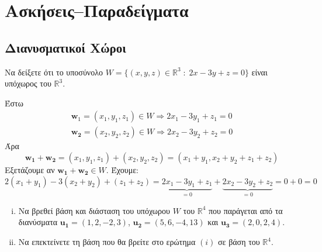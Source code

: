 





\chapter{Ασκήσεις--Παραδείγματα}

\section{Διανυσματικοί Χώροι}





\begin{exercise}
    Να δείξετε ότι το υποσύνολο $ W = \{(x,y,z)\in \mathbb{R}^{3} \; : 
    \; 2x-3y+z=0 \} $ είναι υπόχωρος του $ \mathbb{R}^{3} $.
\end{exercise}

\begin{solution}
\item {}
    Έστω 
    \begin{align*}
        \mathbf{w}_{1} = (x_{1}, y_{1}, z_{1}) \in W 
        \Rightarrow  2 x_{1} - 3 y_{1} + z_{1} = 0 \\
        \mathbf{w_{2}} = (x_{2}, y_{2}, z_{2}) \in W 
        \Rightarrow 2 x_{2} - 3 y_{2} + z_{2} = 0
    \end{align*} 
    Άρα 
    \[
        \mathbf{w_{1}}+ \mathbf{w_{2}} = (x_{1}, y_{1}, z_{1}) + 
        (x_{2}, y_{2}, z_{2}) = (x_{1}+ y_{1}, x_{2}+ y_{2}+ z_{1} + z_{2})
    \] 
    Εξετάζουμε αν $ \mathbf{w_{1}}+ \mathbf{w_{2}} \in W $. Έχουμε:
    \[
        2 (x_{1}+ y_{1}) -3 (x_{2}+ y_{2}) + (z_{1}+ z_{2}) = 
        \underbrace{2 x_{1} - 3 y_{1} + z_{1}}_{=0} + 
        \underbrace{2 x_{2}- 3 y_{2} + z_{2}}_{=0} = 0 + 0 = 0 
    \] 
\end{solution}

\begin{example}
  \begin{enumerate}[i)]
    \item 
  Να βρεθεί βάση και διάσταση του υπόχωρου $W$ του $ \mathbb{R}^{4} $ που παράγεται 
  από τα διανύσματα $ \mathbf{u_{1}} = (1,2,-2,3) $, $ \mathbf{u_{2}} = (5,6,-4,13) $ 
  και $ \mathbf{u_{3}} = (2,0,2,4) $. 
\item 
  Να επεκτείνετε τη βάση που θα βρείτε στο ερώτημα $ (i) $ σε βάση του $ \mathbb{R}^{4} $.
  \end{enumerate}

\end{example}


